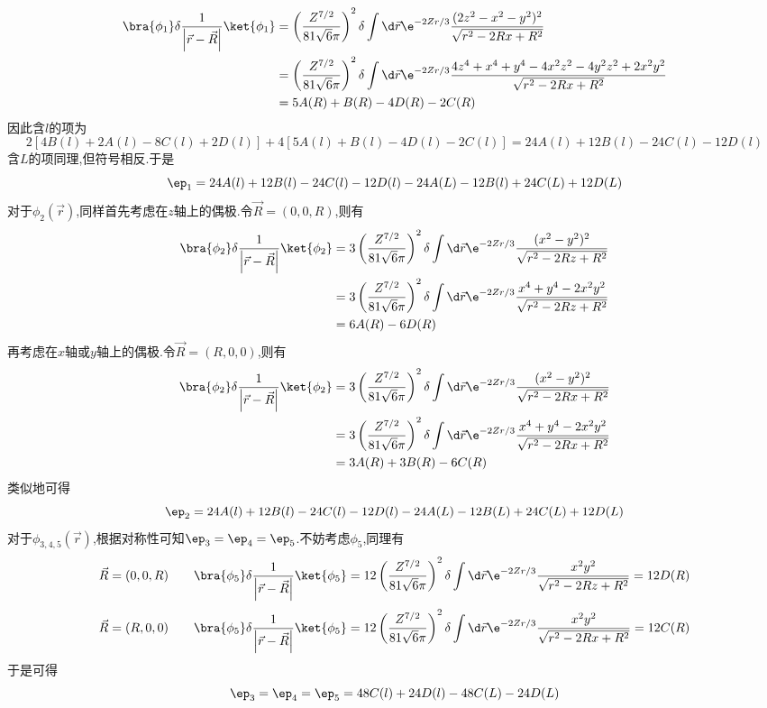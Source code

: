 \documentclass{ctexart}
\begin{document}
\begin{solution}
\begin{enumerate}[label=\tbf{(\alph*)}]
\[\begin{aligned}
            \bra{\phi_1}\delta\dfrac{1}{\left|\vec{r}-\vec{R}\right|}\ket{\phi_1}
            &=\left(\dfrac{Z^{7/2}}{81\sqrt{6}\pi}\right)^2\delta\int\d\vec{r}\e^{-2Zr/3}\dfrac{(2z^2-x^2-y^2)^2}{\sqrt{r^2-2Rx+R^2}}\\
            &=\left(\dfrac{Z^{7/2}}{81\sqrt{6}\pi}\right)^2\delta\int\d\vec{r}\e^{-2Zr/3}\dfrac{4z^4+x^4+y^4-4x^2z^2-4y^2z^2+2x^2y^2}{\sqrt{r^2-2Rx+R^2}}\\
            &=5A(R)+B(R)-4D(R)-2C(R)
        \end{aligned}\]
        因此含$l$的项为
        \[2[4B(l)+2A(l)-8C(l)+2D(l)]+4[5A(l)+B(l)-4D(l)-2C(l)]=24A(l)+12B(l)-24C(l)-12D(l)\]
        含$L$的项同理,但符号相反.于是
        \[\ep_1=24A(l)+12B(l)-24C(l)-12D(l)-24A(L)-12B(l)+24C(L)+12D(L)\]
        对于$\phi_2(\vec{r})$,同样首先考虑在$z$轴上的偶极.令$\vec{R}=(0,0,R)$,则有
        \[\begin{aligned}
            \bra{\phi_2}\delta\dfrac{1}{\left|\vec{r}-\vec{R}\right|}\ket{\phi_2}
            &=3\left(\dfrac{Z^{7/2}}{81\sqrt{6}\pi}\right)^2\delta\int\d\vec{r}\e^{-2Zr/3}\dfrac{(x^2-y^2)^2}{\sqrt{r^2-2Rz+R^2}}\\
            &=3\left(\dfrac{Z^{7/2}}{81\sqrt{6}\pi}\right)^2\delta\int\d\vec{r}\e^{-2Zr/3}\dfrac{x^4+y^4-2x^2y^2}{\sqrt{r^2-2Rz+R^2}}\\
            &=6A(R)-6D(R)
        \end{aligned}\]
        再考虑在$x$轴或$y$轴上的偶极.令$\vec{R}=(R,0,0)$,则有
        \[\begin{aligned}
            \bra{\phi_2}\delta\dfrac{1}{\left|\vec{r}-\vec{R}\right|}\ket{\phi_2}
            &=3\left(\dfrac{Z^{7/2}}{81\sqrt{6}\pi}\right)^2\delta\int\d\vec{r}\e^{-2Zr/3}\dfrac{(x^2-y^2)^2}{\sqrt{r^2-2Rx+R^2}}\\
            &=3\left(\dfrac{Z^{7/2}}{81\sqrt{6}\pi}\right)^2\delta\int\d\vec{r}\e^{-2Zr/3}\dfrac{x^4+y^4-2x^2y^2}{\sqrt{r^2-2Rx+R^2}}\\
            &=3A(R)+3B(R)-6C(R)
        \end{aligned}\]
        类似地可得
        \[\ep_2=24A(l)+12B(l)-24C(l)-12D(l)-24A(L)-12B(L)+24C(L)+12D(L)\]
        对于$\phi_{3,4,5}(\vec{r})$,根据对称性可知$\ep_3=\ep_4=\ep_5$.不妨考虑$\phi_5$,同理有
        \[\vec{R}=(0,0,R)\qquad\bra{\phi_5}\delta\dfrac{1}{\left|\vec{r}-\vec{R}\right|}\ket{\phi_5}
        =12\left(\dfrac{Z^{7/2}}{81\sqrt{6}\pi}\right)^2\delta\int\d\vec{r}\e^{-2Zr/3}\dfrac{x^2y^2}{\sqrt{r^2-2Rz+R^2}}=12D(R)\]
        \[\vec{R}=(R,0,0)\qquad\bra{\phi_5}\delta\dfrac{1}{\left|\vec{r}-\vec{R}\right|}\ket{\phi_5}
        =12\left(\dfrac{Z^{7/2}}{81\sqrt{6}\pi}\right)^2\delta\int\d\vec{r}\e^{-2Zr/3}\dfrac{x^2y^2}{\sqrt{r^2-2Rx+R^2}}=12C(R)\]
        于是可得
        \[\ep_3=\ep_4=\ep_5=48C(l)+24D(l)-48C(L)-24D(L)\]
    \end{enumerate}
\end{solution}
\end{document}
